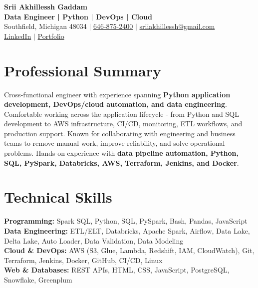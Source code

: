 \documentclass[letterpaper,10pt]{article}
\begin{document}
\fontsize{9.35pt}{10.45pt}\selectfont

\begin{center}
    {\LARGE \textbf{Srii Akhillessh Gaddam}} \\[-1pt]
    \textbf{Data Engineer | Python | DevOps | Cloud} \\[2pt]
    Southfield, Michigan 48034 $|$
    \href{tel:6468752400}{646-875-2400} $|$
    \href{mailto:sriiakhillessh@gmail.com}{sriiakhillessh@gmail.com} \\[1pt]
    \href{https://www.linkedin.com/in/srii-akhiilessh-gaddam-b48668191/}{LinkedIn} $|$
    \href{https://sriiakhillesshg.github.io/portfolio/}{Portfolio}
\end{center}
\vspace{-8pt}

\section{Professional Summary}
\small{Cross-functional engineer with experience spanning \textbf{Python application development, DevOps/cloud automation, and data engineering}. Comfortable working across the application lifecycle - from Python and SQL development to AWS infrastructure, CI/CD, monitoring, ETL workflows, and production support. Known for collaborating with engineering and business teams to remove manual work, improve reliability, and solve operational problems. Hands-on experience with \textbf{data pipeline automation, Python, SQL, PySpark, Databricks, AWS, Terraform, Jenkins, and Docker}.}

\section{Technical Skills}
\small{
\textbf{Programming:} Spark SQL, Python, SQL, PySpark, Bash, Pandas, JavaScript \\
\textbf{Data Engineering:} ETL/ELT, Databricks, Apache Spark, Airflow, Data Lake, Delta Lake, Auto Loader, Data Validation, Data Modeling \\
\textbf{Cloud \& DevOps:} AWS (S3, Glue, Lambda, Redshift, IAM, CloudWatch), Git, Terraform, Jenkins, Docker, GitHub, CI/CD, Linux \\
\textbf{Web \& Databases:} REST APIs, HTML, CSS, JavaScript, PostgreSQL, Snowflake, Greenplum
}
\end{document}
